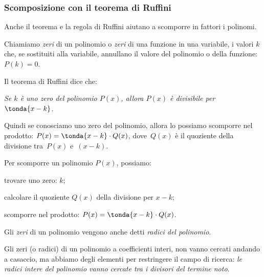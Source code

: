 
\subsubsection{Scomposizione con il teorema di Ruffini}
\label{subsubsec:divpol_scompruff}

Anche il teorema e la regola di Ruffini aiutano a scomporre in fattori i 
polinomi.

Chiamiamo \emph{zeri} di 
un polinomio o \emph{zeri} di una funzione in una variabile, i valori 
\(k\) che, se sostituiti alla variabile, annullano 
il valore del polinomio o della funzione: \(P(k) = 0\).

Il teorema di Ruffini dice che:

\begin{center}
\emph{Se \(k\) è uno zero del polinomio \(P(x)\), allora  
\(P(x)\) è divisibile per \(\tonda{x-k}\).}
\end{center}

Quindi se conosciamo uno zero del polinomio, allora lo possiamo 
scomporre nel prodotto: \(P(x) = \tonda{x-k} \cdot Q(x)\), 
dove~\(Q(x)\) è il quoziente della divisione tra~\(P(x)\) e~\((x-k)\).

\begin{procedura}{}{}
Per scomporre un polinomio \(P(x)\), possiamo:
\begin{enumeratea}
\item trovare uno zero: \(k\);
\item calcolare il quoziente \(Q(x)\) della divisione per \(x-k\);
\item scomporre nel prodotto: \(P(x) = \tonda{x-k} \cdot Q(x)\).
\end{enumeratea}
\end{procedura}

Gli \emph{zeri} di un polinomio vengono anche detti \emph{radici del 
polinomio}.

Gli zeri (o radici) di un polinomio a coefficienti interi, non vanno 
cercati andando a casaccio, ma abbiamo degli elementi per restringere 
il campo di ricerca: 
\emph{le radici intere del polinomio vanno cercate tra i divisori del 
termine noto}.

